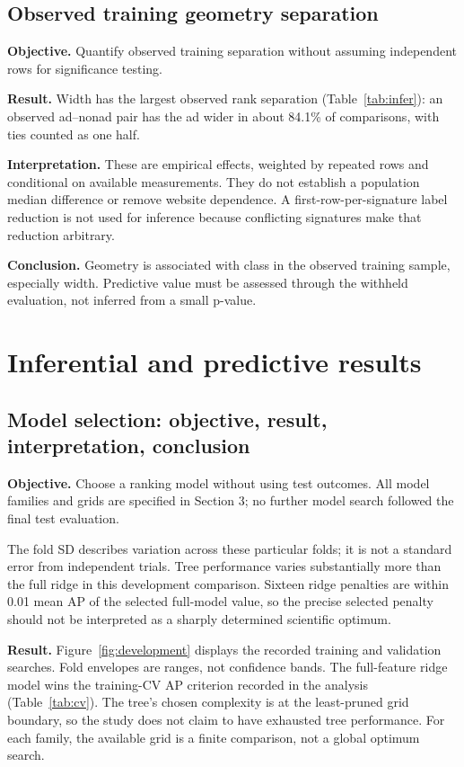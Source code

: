 \documentclass[11pt,a4paper]{article}
\begin{document}
\subsection{Observed training geometry separation}
\textbf{Objective.} Quantify observed training separation without assuming independent rows for significance testing.
\begin{table}[H]\centering\small
\caption{Descriptive training geometry separation; no population significance claim.}
\label{tab:infer}
\end{table}
\textbf{Result.} Width has the largest observed rank separation (Table~\ref{tab:infer}): an observed ad--nonad pair has the ad wider in about 84.1\% of comparisons, with ties counted as one half.

\textbf{Interpretation.} These are empirical effects, weighted by repeated rows and conditional on available measurements. They do not establish a population median difference or remove website dependence. A first-row-per-signature label reduction is not used for inference because conflicting signatures make that reduction arbitrary.

\textbf{Conclusion.} Geometry is associated with class in the observed training sample, especially width. Predictive value must be assessed through the withheld evaluation, not inferred from a small p-value.

\section{Inferential and predictive results}
\subsection{Model selection: objective, result, interpretation, conclusion}
\textbf{Objective.} Choose a ranking model without using test outcomes. All model families and grids are specified in Section 3; no further model search followed the final test evaluation.
\begin{table}[H]\centering
\caption{Training grouped cross-validation selection, using mean fold average precision.}
\label{tab:cv}

The fold SD describes variation across these particular folds; it is not a standard error from independent trials. Tree performance varies substantially more than the full ridge in this development comparison. Sixteen ridge penalties are within 0.01 mean AP of the selected full-model value, so the precise selected penalty should not be interpreted as a sharply determined scientific optimum.
\end{table}
\textbf{Result.} Figure~\ref{fig:development} displays the recorded training and validation searches. Fold envelopes are ranges, not confidence bands. The full-feature ridge model wins the training-CV AP criterion recorded in the analysis (Table~\ref{tab:cv}). The tree's chosen complexity is at the least-pruned grid boundary, so the study does not claim to have exhausted tree performance. For each family, the available grid is a finite comparison, not a global optimum search.
\end{document}
